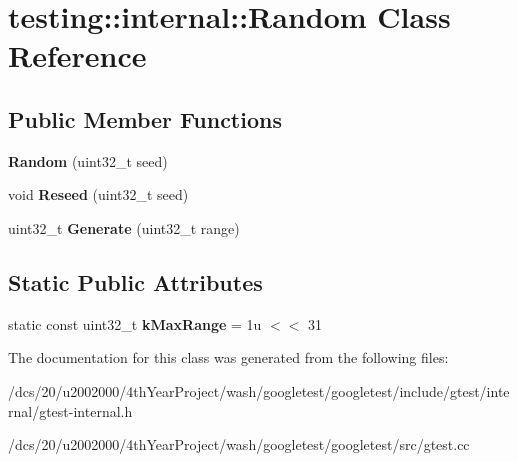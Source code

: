\hypertarget{classtesting_1_1internal_1_1Random}{}\section{testing\+:\+:internal\+:\+:Random Class Reference}
\label{classtesting_1_1internal_1_1Random}
\subsection*{Public Member Functions}
\begin{DoxyCompactItemize}
\item 
\mbox{\label{classtesting_1_1internal_1_1Random_adc88a957f3a98b8b63bdb9fc86732e9c}} 
{\bfseries Random} (uint32\+\_\+t seed)
\item 
\mbox{\label{classtesting_1_1internal_1_1Random_aff90ca107631cf4c8eebdc0602fddc3a}} 
void {\bfseries Reseed} (uint32\+\_\+t seed)
\item 
\mbox{\label{classtesting_1_1internal_1_1Random_a882b0d1ba8659d7ff09862f2394cf443}} 
uint32\+\_\+t {\bfseries Generate} (uint32\+\_\+t range)
\end{DoxyCompactItemize}
\subsection*{Static Public Attributes}
\begin{DoxyCompactItemize}
\item 
\mbox{\label{classtesting_1_1internal_1_1Random_ade731c423ee745216a09cfb2aa9086d7}} 
static const uint32\+\_\+t {\bfseries k\+Max\+Range} = 1u $<$$<$ 31
\end{DoxyCompactItemize}


The documentation for this class was generated from the following files\+:\begin{DoxyCompactItemize}
\item 
/dcs/20/u2002000/4th\+Year\+Project/wash/googletest/googletest/include/gtest/internal/gtest-\/internal.\+h\item 
/dcs/20/u2002000/4th\+Year\+Project/wash/googletest/googletest/src/gtest.\+cc\end{DoxyCompactItemize}
